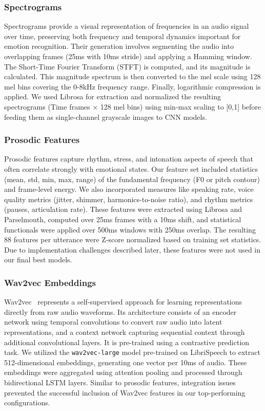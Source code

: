 \documentclass[12pt]{article}
\begin{document}
\subsubsection{Spectrograms}
Spectrograms provide a visual representation of frequencies in an audio signal over time, preserving both frequency and temporal dynamics important for emotion recognition. Their generation involves segmenting the audio into overlapping frames (25ms with 10ms stride) and applying a Hamming window. The Short-Time Fourier Transform (STFT) is computed, and its magnitude is calculated. This magnitude spectrum is then converted to the mel scale using 128 mel bins covering the 0-8kHz frequency range. Finally, logarithmic compression is applied. We used Librosa for extraction and normalized the resulting spectrograms (Time frames × 128 mel bins) using min-max scaling to [0,1] before feeding them as single-channel grayscale images to CNN models.

\subsubsection{Prosodic Features}
Prosodic features capture rhythm, stress, and intonation aspects of speech that often correlate strongly with emotional states. Our feature set included statistics (mean, std, min, max, range) of the fundamental frequency (F0 or pitch contour) and frame-level energy. We also incorporated measures like speaking rate, voice quality metrics (jitter, shimmer, harmonics-to-noise ratio), and rhythm metrics (pauses, articulation rate). These features were extracted using Librosa and Parselmouth, computed over 25ms frames with a 10ms shift, and statistical functionals were applied over 500ms windows with 250ms overlap. The resulting 88 features per utterance were Z-score normalized based on training set statistics. Due to implementation challenges described later, these features were not used in our final best models.

\subsubsection{Wav2vec Embeddings}
Wav2vec~\cite{schneider2019wav2vec} represents a self-supervised approach for learning representations directly from raw audio waveforms. Its architecture consists of an encoder network using temporal convolutions to convert raw audio into latent representations, and a context network capturing sequential context through additional convolutional layers. It is pre-trained using a contrastive prediction task. We utilized the \texttt{wav2vec-large} model pre-trained on LibriSpeech to extract 512-dimensional embeddings, generating one vector per 10ms of audio. These embeddings were aggregated using attention pooling and processed through bidirectional LSTM layers. Similar to prosodic features, integration issues prevented the successful inclusion of Wav2vec features in our top-performing configurations.
\end{document}
